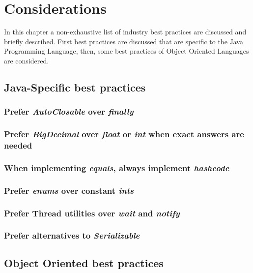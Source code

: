\chapter{\label{cha:title}Considerations}

In this chapter a non-exhaustive list of industry best practices are discussed and briefly described. First best practices are discussed that are specific to the Java Programming Language, then, some best practices of Object Oriented Languages are considered.

\section{Java-Specific best practices}

\subsection{Prefer \emph{AutoClosable} over \emph{finally}}

\subsection{Prefer \emph{BigDecimal} over \emph{float} or \emph{int} when exact answers are needed}

\subsection{When implementing \emph{equals}, always implement \emph{hashcode}}

\subsection{Prefer \emph{enums} over constant \emph{ints}}

\subsection{Prefer Thread utilities over \emph{wait} and \emph{notify}}

\subsection{Prefer alternatives to \emph{Serializable}}

\section{Object Oriented best practices}

